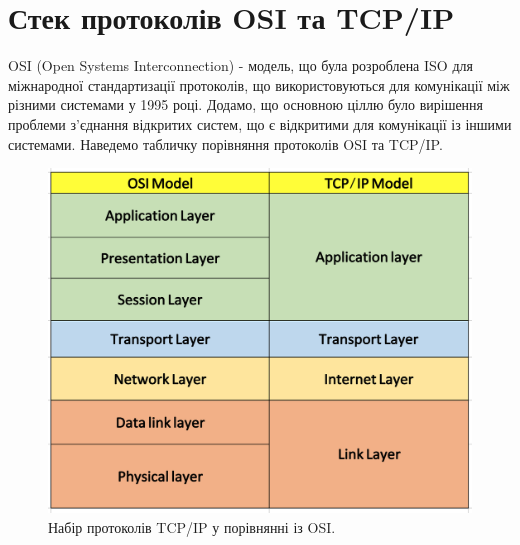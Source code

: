 
\section{Стек протоколів OSI та TCP/IP}

OSI (Open Systems Interconnection) - модель, що була розроблена ISO для міжнародної стандартизації протоколів, що використовуються для комунікації між різними системами у 1995 році. Додамо, що основною ціллю було вирішення проблеми з'єднання відкритих систем, що є відкритими для комунікації із іншими системами. Наведемо табличку порівняння протоколів OSI та TCP/IP. 

\begin{figure}[ht]
        \centering
        \includegraphics[scale=0.15]{../IMAGES/tcp_ip_osi.png}
        \caption{Набір протоколів TCP/IP у порівнянні із OSI.}
        \label{tcp_ip_protocols_suite}
\end{figure}

